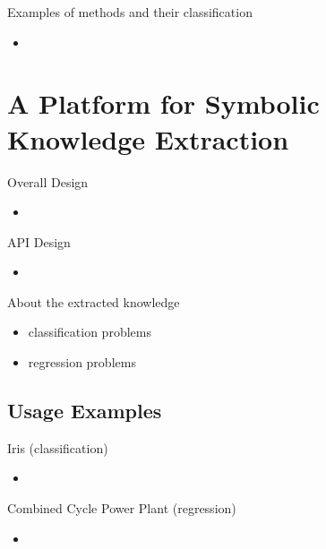 \documentclass[presentation]{beamer}\mode<presentation>{\usetheme{AMSBolognaFC}}
\begin{document}
\begin{frame}{Examples of methods and their classification}
    \begin{itemize}
        \item 
    \end{itemize}
\end{frame}

\section{A Platform for Symbolic Knowledge Extraction}

\begin{frame}{Overall Design}
    \begin{itemize}
        \item 
    \end{itemize}
\end{frame}

\begin{frame}{API Design}
    \begin{itemize}
        \item 
    \end{itemize}
\end{frame}

\begin{frame}{About the extracted knowledge}
    \begin{itemize}
        \item classification problems
        \item regression problems
    \end{itemize}
\end{frame}

\subsection{Usage Examples}

\begin{frame}{Iris (classification)}
    \begin{itemize}
        \item 
    \end{itemize}
\end{frame}

\begin{frame}{Combined Cycle Power Plant (regression)}
    \begin{itemize}
        \item 
    \end{itemize}
\end{frame}
\end{document}
